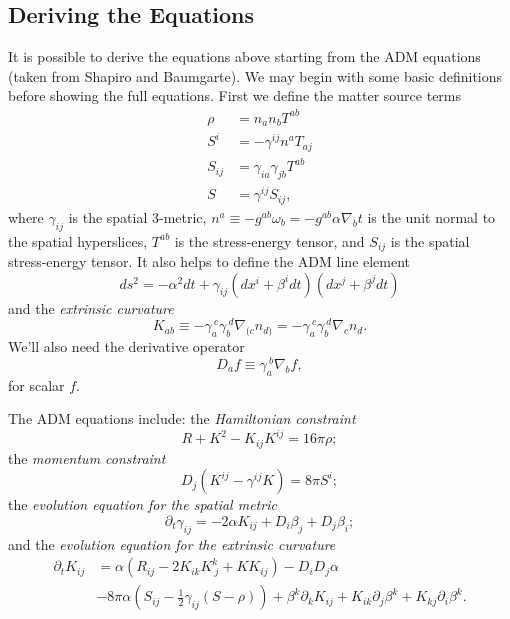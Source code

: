 \documentclass[12pt]{article}
\numberwithin{equation}{section}
\begin{document}
\subsection{Deriving the Equations}
It is possible to derive the equations above starting from the ADM equations (taken from Shapiro and Baumgarte).  We may begin with some basic definitions before showing the full equations.  First we define the matter source terms
\begin{align}
\rho &= n_a n_b T^{ab} \\
S^i &= -\gamma^{ij} n^a T_{aj} \\
S_{ij} &= \gamma_{ia} \gamma_{jb} T^{ab} \\
S &= \gamma^{ij} S_{ij},
\end{align}
where $\gamma_{ij}$ is the spatial 3-metric, $n^a \equiv - g^{ab} \omega_b = -g^{ab} \alpha \nabla_b t$ is the unit normal to the spatial hyperslices, $T^{ab}$ is the stress-energy tensor, and $S_{ij}$ is the spatial stress-energy tensor.  It also helps to define the ADM line element
\begin{equation} \label{eq:ADM_line_element}
ds^2 = -\alpha^2 dt + \gamma_{ij} (dx^i + \beta^i dt) (dx^j + \beta^j dt)
\end{equation}
and the \textit{extrinsic curvature}
\begin{equation}
K_{ab} \equiv - \gamma_a^{~c} \gamma_b^{~d} \nabla_{(c} n_{d)} = - \gamma_a^{~c} \gamma_b^{~d} \nabla_c n_d.
\end{equation}
We'll also need the derivative operator
\begin{equation}
D_a f \equiv \gamma_{a}^{~b} \nabla_b f,
\end{equation}
for scalar $f$.

The ADM equations include: the \textit{Hamiltonian constraint}
\begin{equation}
R + K^2 - K_{ij} K^{ij} = 16 \pi \rho;
\end{equation}
the \textit{momentum constraint}
\begin{equation}
D_j (K^{ij} - \gamma^{ij} K) = 8 \pi S^{i};
\end{equation}
the \textit{evolution equation for the spatial metric}
\begin{equation} \label{eq:spatial_metric_evol}
\partial_t \gamma_{ij} = -2 \alpha K_{ij} + D_i \beta_j + D_j \beta_i;
\end{equation}
and the \textit{evolution equation for the extrinsic curvature}
\begin{equation}
\begin{aligned}
\partial_t K_{ij} &= \alpha (R_{ij} - 2 K_{ik} K^{k}_{~j} + K K_{ij}) - D_i D_j \alpha \\
&- 8 \pi \alpha (S_{ij} - \frac{1}{2} \gamma_{ij} (S - \rho)) + \beta^k \partial_k K_{ij} + K_{ik} \partial_j \beta^k + K_{kj} \partial_i \beta^k.
\end{aligned}
\end{equation}
\end{document}
